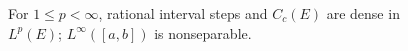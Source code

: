 \documentclass[a4paper]{article}
\begin{document}
\thispagestyle{empty}
\begin{figure}[H]
  \centering
  
  \caption{For $1\leq p<\infty$, rational interval steps and $C_c(E)$ are dense in $L^p(E)$; $L^\infty([a,b])$ is nonseparable.}
\end{figure}
\end{document}
